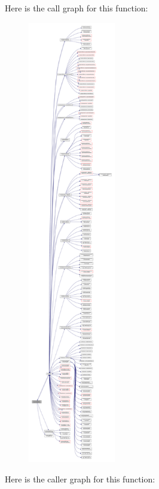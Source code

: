 Here is the call graph for this function\+:\nopagebreak
\begin{figure}[H]
\begin{center}
\leavevmode
\includegraphics[height=550pt]{namespacemodulemog2dformat_a734bfcb7f534ab9c91af8672cea24021_cgraph}
\end{center}
\end{figure}
Here is the caller graph for this function\+:\nopagebreak
